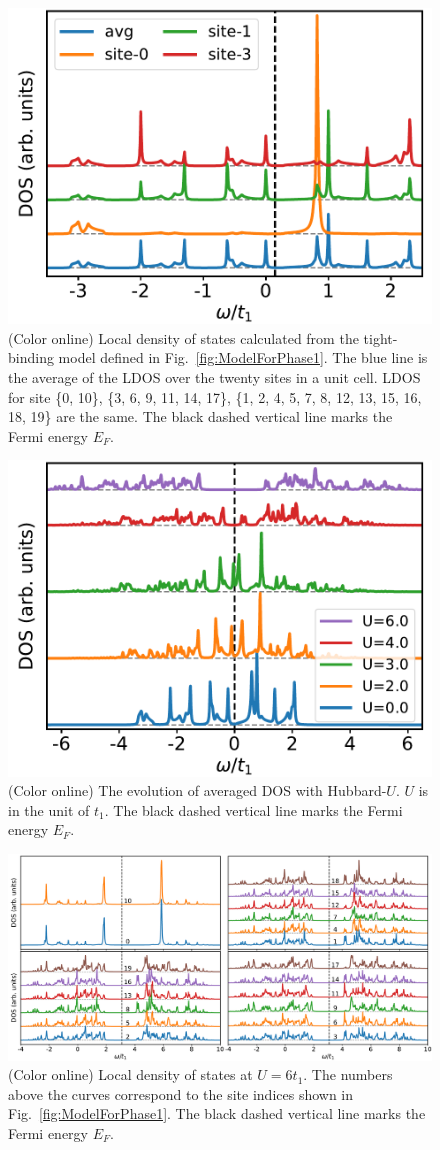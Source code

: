 \documentclass[aps,prb,amsfonts,amsmath,amssymb,showpacs,groupedaddress,superscriptaddress]{revtex4-1}
\begin{document}
\begin{figure}[p]
    \includegraphics[width=0.5\columnwidth]{fig/TBAForPhase1.pdf}
    \caption{\label{fig:TBAForPhase1} (Color online) Local density of states calculated from the tight-binding model defined in Fig.~\ref{fig:ModelForPhase1}. The blue line is the average of the LDOS over the twenty sites in a unit cell. LDOS for site \{0, 10\}, \{3, 6, 9, 11, 14, 17\}, \{1, 2, 4, 5, 7, 8, 12, 13, 15, 16, 18, 19\} are the same. The black dashed vertical line marks the Fermi energy $E_{F}$.}
\end{figure}

\begin{figure}[p]
    \includegraphics[width=0.5\columnwidth]{fig/CPTForPhase1.pdf}
    \caption{\label{fig:CPTForPhase1} (Color online) The evolution of averaged DOS with Hubbard-$U$. $U$ is in the unit of $t_{1}$. The black dashed vertical line marks the Fermi energy $E_{F}$.}
\end{figure}

\begin{figure}[p]
    \centering
    \includegraphics[width=0.95\columnwidth]{fig/CPTForPhase1LDOS.pdf}
    \caption{\label{fig:CPTForPhase1LDOS} (Color online) Local density of states at $U = 6 t_{1}$. The numbers above the curves correspond to the site indices shown in Fig.~\ref{fig:ModelForPhase1}. The black dashed vertical line marks the Fermi energy $E_{F}$.}
\end{figure}
\end{document}
